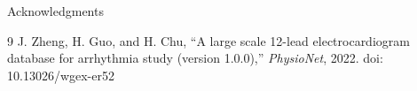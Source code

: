 \documentclass[final]{beamer}
\newlength{\sepwidth}
\newlength{\colwidth}
\newcommand{\separatorcolumn}{\begin{column}{\sepwidth}\end{column}}
\begin{document}
\begin{frame}[t]
\begin{columns}[t]
\begin{column}{\colwidth}
\begin{block}{Acknowledgments}
\begin{thebibliography}{9}
						J. Zheng, H. Guo, and H. Chu, 
						``A large scale 12-lead electrocardiogram database for arrhythmia study (version 1.0.0),'' 
						\textit{PhysioNet}, 2022. 
						doi: 10.13026/wgex-er52
						
					\end{thebibliography}
				\end{block}
				
				
			\end{column}
			
			\separatorcolumn
		\end{columns}
	\end{frame}
	
\end{document}
